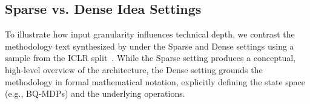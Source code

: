 \clearpage

\subsection{Sparse vs. Dense Idea Settings}
\label{appendix:paper_viz_sparse_dense}

To illustrate how input granularity influences technical depth, we contrast the methodology text synthesized by \ourmethod{} under the Sparse and Dense settings using a sample from the ICLR split~\citep{drakulic2025goalgeneralistcombinatorialoptimization}. While the Sparse setting produces a conceptual, high-level overview of the architecture, the Dense setting grounds the methodology in formal mathematical notation, explicitly defining the state space (e.g., BQ-MDPs) and the underlying operations.

\begin{methodologybox}

\end{methodologybox}

\begin{methodologybox}

\end{methodologybox}